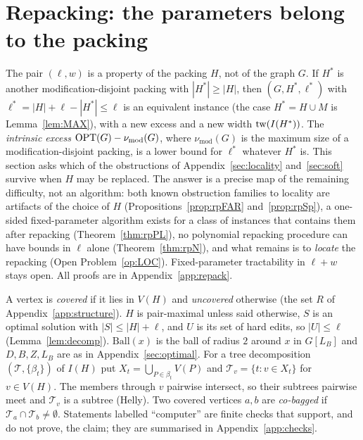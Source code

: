 \section{Repacking: the parameters belong to the packing}\label{sec:repack}
The pair $(\ell,w)$ is a property of the packing $H$, not of the graph $G$. If $H^*$ is another modification-disjoint packing with $|H^*|\ge|H|$, then $(G,H^*,\ell^*)$ with $\ell^*=|H|+\ell-|H^*|\le\ell$ is an equivalent instance (the case $H^*=H\cup M$ is Lemma~\ref{lem:MAX}), with a new excess and a new width $\mathrm{tw}(I(H^*))$. The \emph{intrinsic excess} $\mathrm{OPT}(G)-\nu_{\mathrm{mod}}(G)$, where $\nu_{\mathrm{mod}}(G)$ is the maximum size of a modification-disjoint packing, is a lower bound for $\ell^*$ whatever $H^*$ is. This section asks which of the obstructions of Appendix~\ref{sec:locality} and~\ref{sec:soft} survive when $H$ may be replaced. The answer is a precise map of the remaining difficulty, not an algorithm: both known obstruction families to locality are artifacts of the choice of $H$ (Propositions~\ref{prop:rpFAR} and~\ref{prop:rpSp}), a one-sided fixed-parameter algorithm exists for a class of instances that contains them after repacking (Theorem~\ref{thm:rpPL}), no polynomial repacking procedure can have bounds in $\ell$ alone (Theorem~\ref{thm:rpN}), and what remains is to \emph{locate} the repacking (Open Problem~\ref{op:LOC}). Fixed-parameter tractability in $\ell+w$ stays open. All proofs are in Appendix~\ref{app:repack}.

A vertex is \emph{covered} if it lies in $V(H)$ and \emph{uncovered} otherwise (the set $R$ of Appendix~\ref{app:structure}). $H$ is pair-maximal unless said otherwise, $S$ is an optimal solution with $|S|\le|H|+\ell$, and $U$ is its set of hard edits, so $|U|\le\ell$ (Lemma~\ref{lem:decomp}). $\mathrm{Ball}(x)$ is the ball of radius $2$ around $x$ in $G[L_B]$ and $D,B,Z,L_B$ are as in Appendix~\ref{sec:optimal}. For a tree decomposition $(\mathcal T,\{\beta_t\})$ of $I(H)$ put $X_t=\bigcup_{P\in\beta_t}V(P)$ and $\mathcal T_v=\{t:v\in X_t\}$ for $v\in V(H)$. The members through $v$ pairwise intersect, so their subtrees pairwise meet and $\mathcal T_v$ is a subtree (Helly). Two covered vertices $a,b$ are \emph{co-bagged} if $\mathcal T_a\cap\mathcal T_b\neq\emptyset$. Statements labelled ``computer'' are finite checks that support, and do not prove, the claim; they are summarised in Appendix~\ref{app:checks}.

